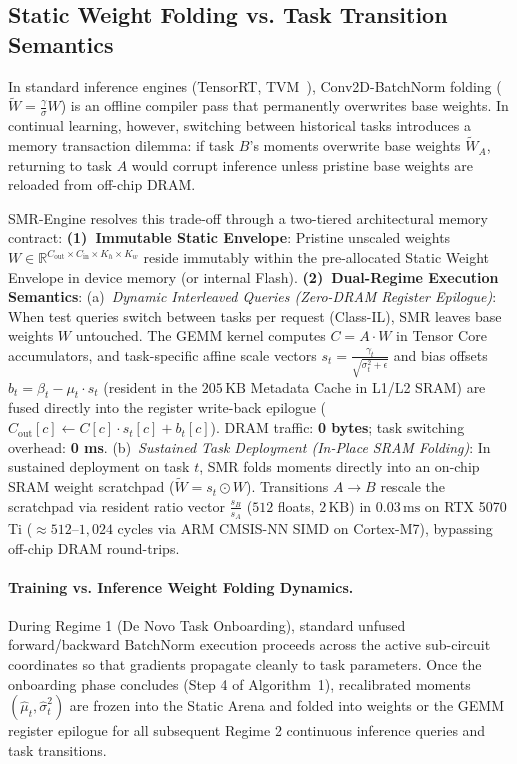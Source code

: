 \documentclass{article}
\begin{document}
\subsection{Static Weight Folding vs. Task Transition Semantics}
In standard inference engines (TensorRT, TVM~\cite{chen2018tvm}), Conv2D-BatchNorm folding ($\tilde{W} = \frac{\gamma}{\sigma} W$) is an offline compiler pass that permanently overwrites base weights. In continual learning, however, switching between historical tasks introduces a memory transaction dilemma: if task $B$'s moments overwrite base weights $\tilde{W}_A$, returning to task $A$ would corrupt inference unless pristine base weights are reloaded from off-chip DRAM.

SMR-Engine resolves this trade-off through a two-tiered architectural memory contract:
\textbf{(1)~Immutable Static Envelope}: Pristine unscaled weights $W \in \mathbb{R}^{C_{\mathrm{out}} \times C_{\mathrm{in}} \times K_h \times K_w}$ reside immutably within the pre-allocated Static Weight Envelope in device memory (or internal Flash).
\textbf{(2)~Dual-Regime Execution Semantics}:
(a)~\emph{Dynamic Interleaved Queries (Zero-DRAM Register Epilogue)}: When test queries switch between tasks per request (Class-IL), SMR leaves base weights $W$ untouched. The GEMM kernel computes $C = A \cdot W$ in Tensor Core accumulators, and task-specific affine scale vectors $s_t = \frac{\gamma_t}{\sqrt{\sigma_t^2+\epsilon}}$ and bias offsets $b_t = \beta_t - \mu_t \cdot s_t$ (resident in the $205\,\text{KB}$ Metadata Cache in L1/L2 SRAM) are fused directly into the register write-back epilogue ($C_{\mathrm{out}}[c] \leftarrow C[c] \cdot s_t[c] + b_t[c]$). DRAM traffic: \textbf{0 bytes}; task switching overhead: \textbf{0 ms}.
(b)~\emph{Sustained Task Deployment (In-Place SRAM Folding)}: In sustained deployment on task $t$, SMR folds moments directly into an on-chip SRAM weight scratchpad ($\tilde{W} = s_t \odot W$). Transitions $A \to B$ rescale the scratchpad via resident ratio vector $\frac{s_B}{s_A}$ ($512$ floats, $2\,\text{KB}$) in $0.03\,\text{ms}$ on RTX 5070 Ti ($\approx 512\text{--}1{,}024$ cycles via ARM CMSIS-NN SIMD on Cortex-M7), bypassing off-chip DRAM round-trips.
\paragraph{Training vs. Inference Weight Folding Dynamics.} During Regime 1 (De Novo Task Onboarding), standard unfused forward/backward BatchNorm execution proceeds across the active sub-circuit coordinates so that gradients propagate cleanly to task parameters. Once the onboarding phase concludes (Step 4 of Algorithm~1), recalibrated moments $(\hat{\mu}_t, \hat{\sigma}_t^2)$ are frozen into the Static Arena and folded into weights or the GEMM register epilogue for all subsequent Regime 2 continuous inference queries and task transitions.
\end{document}
